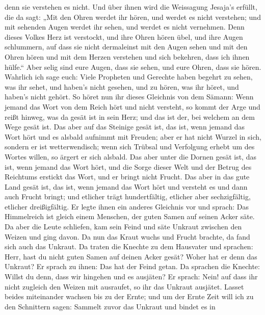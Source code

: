 denn sie verstehen es nicht.  Und über ihnen wird die
Weissagung Jesaja's erfüllt, die da sagt: „Mit den Ohren werdet ihr
hören, und werdet es nicht verstehen; und mit sehenden Augen werdet ihr
sehen, und werdet es nicht vernehmen.  Denn dieses Volkes
Herz ist verstockt, und ihre Ohren hören übel, und ihre Augen
schlummern, auf dass sie nicht dermaleinst mit den Augen sehen und mit
den Ohren hören und mit dem Herzen verstehen und sich bekehren, dass ich
ihnen hülfe.``  Aber selig sind eure Augen, dass sie sehen,
und eure Ohren, dass sie hören.  Wahrlich ich sage euch:
Viele Propheten und Gerechte haben begehrt zu sehen, was ihr sehet, und
haben's nicht gesehen, und zu hören, was ihr höret, und haben's nicht
gehört.  So höret nun ihr dieses Gleichnis von dem Sämann:
 Wenn jemand das Wort von dem Reich hört und nicht
versteht, so kommt der Arge und reißt hinweg, was da gesät ist in sein
Herz; und das ist der, bei welchem an dem Wege gesät ist. 
Das aber auf das Steinige gesät ist, das ist, wenn jemand das Wort hört
und es alsbald aufnimmt mit Freuden;  aber er hat nicht
Wurzel in sich, sondern er ist wetterwendisch; wenn sich Trübsal und
Verfolgung erhebt um des Wortes willen, so ärgert er sich alsbald.
 Das aber unter die Dornen gesät ist, das ist, wenn jemand
das Wort hört, und die Sorge dieser Welt und der Betrug des Reichtums
erstickt das Wort, und er bringt nicht Frucht.  Das aber in
das gute Land gesät ist, das ist, wenn jemand das Wort hört und versteht
es und dann auch Frucht bringt; und etlicher trägt hundertfältig,
etlicher aber sechzigfältig, etlicher dreißigfältig.  Er
legte ihnen ein anderes Gleichnis vor und sprach: Das Himmelreich ist
gleich einem Menschen, der guten Samen auf seinen Acker säte.
 Da aber die Leute schliefen, kam sein Feind und säte
Unkraut zwischen den Weizen und ging davon.  Da nun das
Kraut wuchs und Frucht brachte, da fand sich auch das Unkraut.
 Da traten die Knechte zu dem Hausvater und sprachen: Herr,
hast du nicht guten Samen auf deinen Acker gesät? Woher hat er denn das
Unkraut?  Er sprach zu ihnen: Das hat der Feind getan. Da
sprachen die Knechte: Willst du denn, dass wir hingehen und es ausjäten?
 Er sprach: Nein! auf dass ihr nicht zugleich den Weizen
mit ausraufet, so ihr das Unkraut ausjätet.  Lasset beides
miteinander wachsen bis zu der Ernte; und um der Ernte Zeit will ich zu
den Schnittern sagen: Sammelt zuvor das Unkraut und bindet es in
